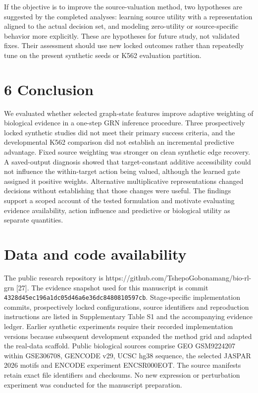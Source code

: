 \documentclass[
  11pt,
]{article}
\begin{document}
If the objective is to improve the source-valuation method, two
hypotheses are suggested by the completed analyses: learning source
utility with a representation aligned to the actual decision set, and
modeling zero-utility or source-specific behavior more explicitly. These
are hypotheses for future study, not validated fixes. Their assessment
should use new locked outcomes rather than repeatedly tune on the
present synthetic seeds or K562 evaluation partition.

\section{6 Conclusion}\label{conclusion}

We evaluated whether selected graph-state features improve adaptive
weighting of biological evidence in a one-step GRN inference procedure.
Three prospectively locked synthetic studies did not meet their primary
success criteria, and the developmental K562 comparison did not
establish an incremental predictive advantage. Fixed source weighting
was stronger on clean synthetic edge recovery. A saved-output diagnosis
showed that target-constant additive accessibility could not influence
the within-target action being valued, although the learned gate
assigned it positive weights. Alternative multiplicative representations
changed decisions without establishing that those changes were useful.
The findings support a scoped account of the tested formulation and
motivate evaluating evidence availability, action influence and
predictive or biological utility as separate quantities.

\section{Data and code availability}\label{data-and-code-availability}

The public research repository is
https://github.com/TshepoGobonamang/bio-rl-grn {[}27{]}. The evidence
snapshot used for this manuscript is commit
\texttt{4328d45ec196a1dc05d46a6e36dc8480810597cb}. Stage-specific
implementation commits, prospectively locked configurations, source
identifiers and reproduction instructions are listed in Supplementary
Table S1 and the accompanying evidence ledger. Earlier synthetic
experiments require their recorded implementation versions because
subsequent development expanded the method grid and adapted the
real-data scaffold. Public biological sources comprise GEO GSM9224207
within GSE306708, GENCODE v29, UCSC hg38 sequence, the selected JASPAR
2026 motifs and ENCODE experiment ENCSR000EOT. The source manifests
retain exact file identifiers and checksums. No new expression or
perturbation experiment was conducted for the manuscript preparation.
\end{document}
